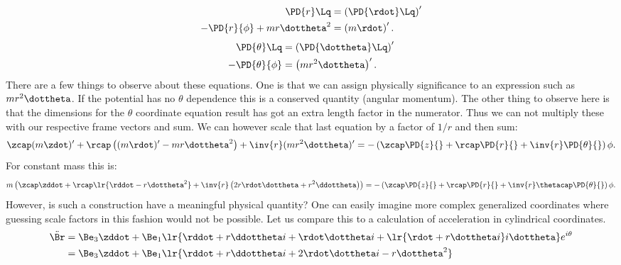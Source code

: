 {\begin{equation}
\begin{aligned}
\PD{r}\Lq &= \left(\PD{\rdot}\Lq\right)' \\
-\PD{r}{\phi} + m r \dottheta^2 &= \left(m\rdot\right)' .
\end{aligned}
\end{equation}
\begin{equation}\label{eqn:tongMf1:720}
\begin{aligned}
\PD{\theta}\Lq &= \left(\PD{\dottheta}\Lq\right)' \\
-\PD{\theta}{\phi} &= \left(m r^2 \dottheta\right)' .
\end{aligned}
\end{equation}
%
There are a few things to observe about these equations.  One is that we can assign physically significance to an expression such as \(m r^2 \dottheta\).  If the potential has no \(\theta\) dependence this is a conserved quantity (angular momentum).
%
The other thing to observe here is that the dimensions for the \(\theta\) coordinate equation result has got an extra length factor in the numerator.  Thus we can not multiply these with our respective frame vectors and sum.  We can however scale that last equation by a factor of \(1/r\) and then sum:
%
\begin{equation}\label{eqn:tongMf1:1820}
\zcap (m\zdot)' + \rcap \left((m\rdot)' - m r \dottheta^2\right) + \inv{r} (mr^2 \dottheta)' = - \left(\zcap \PD{z}{} + \rcap \PD{r}{} + \inv{r} \PD{\theta}{}\right) \phi.
\end{equation}
%
For constant mass this is:
\begin{equation}\label{eqn:tongMf1:1840}
m \left( \zcap \zddot + \rcap
\lr{ \rddot - r \dottheta^2 }
 + \inv{r} \left(2 r \rdot \dottheta + r^2 \ddottheta\right) \right) = - \left(\zcap \PD{z}{} + \rcap \PD{r}{} + \inv{r} \thetacap \PD{\theta}{}\right) \phi.
\end{equation}
%
However, is such a construction have a meaningful physical quantity?  One can easily imagine more complex generalized coordinates where guessing scale factors in this fashion would not be possible.
%
Let us compare this to a calculation of acceleration in cylindrical coordinates.
%
\begin{equation}\label{eqn:tongMf1:740}
\begin{aligned}
\ddot{\Br} &= \Be_3 \zddot + \Be_1
\lr{ \rddot + r \ddottheta i + \rdot \dottheta i + \lr{ \rdot + r \dottheta i } i\dottheta }
 e^{i\theta} \\
           &= \Be_3 \zddot + \Be_1
\lr{ \rddot + r \ddottheta i + 2 \rdot \dottheta i - r \dottheta^2 }

\end{aligned}
\end{equation}}
